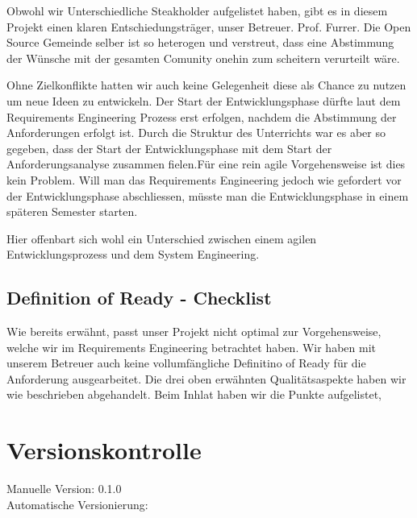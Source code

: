 \documentclass[11pt,titelpage]{scrartcl}
\begin{document}
Obwohl wir Unterschiedliche Steakholder aufgelistet haben, gibt es in diesem Projekt einen klaren Entschiedungsträger, unser Betreuer. Prof. Furrer. Die Open Source Gemeinde selber ist so heterogen und verstreut, dass  eine Abstimmung der Wünsche mit der gesamten Comunity onehin zum scheitern verurteilt wäre.

Ohne Zielkonflikte hatten wir auch keine Gelegenheit diese als Chance zu nutzen um neue Ideen zu entwickeln. Der Start der Entwicklungsphase dürfte laut dem Requirements Engineering Prozess erst erfolgen, nachdem die Abstimmung der Anforderungen erfolgt ist.
Durch die Struktur des Unterrichts war es aber so gegeben, dass der Start der Entwicklungsphase  mit dem Start der Anforderungsanalyse zusammen fielen.Für eine rein agile Vorgehensweise ist dies kein Problem. Will man das Requirements Engineering jedoch wie gefordert vor der Entwicklungsphase abschliessen, müsste man die Entwicklungsphase in einem späteren Semester starten.



Hier offenbart sich wohl ein Unterschied zwischen  einem agilen Entwicklungsprozess und dem System Engineering.
\subsection{Definition of Ready - Checklist}
Wie bereits erwähnt, passt unser Projekt nicht optimal zur Vorgehensweise, welche wir im Requirements Engineering betrachtet haben. Wir haben mit unserem Betreuer auch keine vollumfängliche Definitino of Ready für die Anforderung ausgearbeitet. Die drei oben erwähnten Qualitätsaspekte haben wir wie beschrieben abgehandelt. Beim Inhlat haben wir die Punkte aufgelistet, 
\section{Versionskontrolle}
Manuelle Version: 0.1.0
\\

\noindent
Automatische Versionierung:
\immediate{}

\immediate{}
\end{document}
